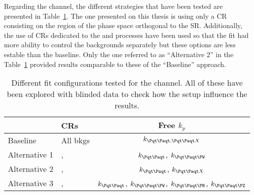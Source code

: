 \begin{comment} %
	but in this analysis the normalisation of \ttW process is left as a free floating parameter.
	This is done because 
	there is a mild tension between the theory predictions on the \ttW production and the experimental results.
	Both ATLAS and CMS have shown some over-abundance in data compared to theoretical predictions~\cite{ATLAS:2023gon, CMS:2022tkv}.
	Therefore, the $k_{\ttW}$ has to be determined in the \dilepSStau channel, where the \ttW production is one of the main backgrounds.
	For the \dilepOStau, the contribution of \ttW to the total background is negligible compared to that of \ttbar or \Zjets and, hence, no dedicated $k_{\ttW}$
	is derived in this region.  
\end{comment}

Regarding the \dilepSStau channel, the different strategies that have been tested are presented 
in Table~\ref{tab:tHq:FitConfiguration:SS}. The one presented on this thesis is using only a CR 
consisting on the region of the phase space orthogonal to the SR.  Additionally, the use of CRs
dedicated to the \ttbar and \ttX processes have been used so that the fit had more ability to
control the backgrounds separately but these options are less estable than the baseline.
Only the one referred to as ``Alternative 2'' in the Table~\ref{tab:tHq:FitConfiguration:SS} provided
results comparable to these of the ``Baseline'' approach.


\begin{table}[h]
\centering
\begin{tabular}{l|l|c}
\toprule
            	  	& CRs           	& Free $k_{p}$                      					\\ \midrule
Baseline	 	& All bkgs		& $k_{\ttbar, \ttX}$          						\\ 
Alternative 1	& \ttbar, \ttX 	& $k_{\ttbar}$, $k_{\ttW}$                                   	 	\\
Alternative 2	&\ttbar, \ttX	& $k_{\ttbar}$, $k_{\ttX}$                        			\\
Alternative 3	&\ttbar, \ttX	& $k_{\ttbar}$, $k_{\ttW}$, $k_{\ttH}$, $k_{\ttZ}$		\\ \bottomrule
\end{tabular} 
\caption{Different fit configurations tested for the \dilepSStau channel. All of these have
been explored with blinded data to check how the setup influence the results.}
\label{tab:tHq:FitConfiguration:SS}
\end{table}



